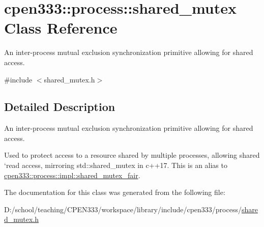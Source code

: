 \hypertarget{classcpen333_1_1process_1_1shared__mutex}{}\section{cpen333\+:\+:process\+:\+:shared\+\_\+mutex Class Reference}
\label{classcpen333_1_1process_1_1shared__mutex}


An inter-\/process mutual exclusion synchronization primitive allowing for shared access.  




{\ttfamily \#include $<$shared\+\_\+mutex.\+h$>$}



\subsection{Detailed Description}
An inter-\/process mutual exclusion synchronization primitive allowing for shared access. 

Used to protect access to a resource shared by multiple processes, allowing shared `read\textquotesingle{} access, mirroring std\+::shared\+\_\+mutex in c++17. This is an alias to \hyperlink{classcpen333_1_1process_1_1impl_1_1shared__mutex__fair}{cpen333\+::process\+::impl\+::shared\+\_\+mutex\+\_\+fair}. 

The documentation for this class was generated from the following file\+:\begin{DoxyCompactItemize}
\item 
D\+:/school/teaching/\+C\+P\+E\+N333/workspace/library/include/cpen333/process/\hyperlink{process_2shared__mutex_8h}{shared\+\_\+mutex.\+h}\end{DoxyCompactItemize}
